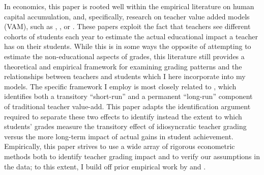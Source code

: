\documentclass[../thesis_main.tex]{subfiles}
\begin{document}
In economics, this paper is rooted well within the empirical literature on human capital accumulation, and, specifically, research on teacher value added models (VAM), such as \cite{chettyMeasuringImpactsTeachers2014}, \cite{kaneEstimatingTeacherImpacts2008}, or \cite{jacksonTeacherEffectsTeacherRelated2014}. These papers exploit the fact that teachers see different cohorts of students each year to estimate the actual educational impact a teacher has on their students. While this is in some ways the opposite of attempting to estimate the non-educational aspects of grades, this literature still provides a theoretical and empirical framework for examining grading patterns and the relationships between teachers and students which I here incorporate into my models. The specific framework I employ is most closely related to \cite{gilraineMakingTeachingLast2020}, which identifies both a transitory ``short-run'' and a permanent ``long-run'' component of traditional teacher value-add. This paper adapts the identification argument required to separate these two effects to identify instead the extent to which students' grades measure the transitory effect of idiosyncratic teacher grading versus the more long-term impact of actual gains in student achievement. Empirically, this paper strives to use a wide array of rigorous econometric methods both to identify teacher grading impact and to verify our assumptions in the data; to this extent, I  build off prior empirical work by \cite{abdulkadirogluChartersLotteriesTesting2016} and \cite{kolesarIdentificationInferenceMany2015}.
\end{document}
